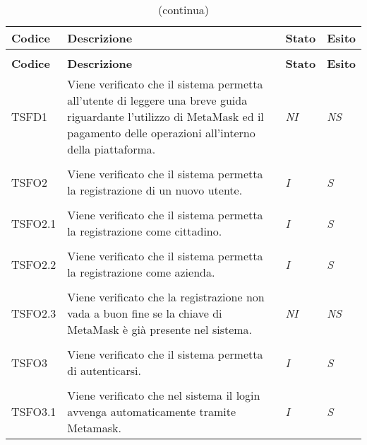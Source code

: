 	\begin{longtable}{ >{\centering}p{} >{}p{}
			>{\centering}p{} >{\centering}p{}}
			
		\caption{Riepilogo Test di Sistema}\\	
		\rowcolorhead
		\textbf{\color{white}Codice} 
		& \centering\textbf{\color{white}Descrizione} 
		& \centering\textbf{\color{white}Stato}
		& \centering\textbf{\color{white}Esito} 
		\tabularnewline %
		\endfirsthead	
		
		\rowcolor{white}\caption[]{(continua)}\\	
		\rowcolorhead
		\textbf{\color{white}Codice} 
		& \centering\textbf{\centering\color{white}Descrizione} 
		& \centering\textbf{\color{white}Stato}
		& \centering\textbf{\color{white}Esito} 
		\tabularnewline %
		\endhead	
		

		\hypertarget{TSFD1}{TSFD1} & Viene verificato che il sistema permetta all'utente 
		di leggere una breve guida riguardante l'utilizzo di MetaMask ed il pagamento 
		delle operazioni all'interno della piattaforma. & \textit{NI} & \textit{NS}\\ 

		\tabularnewline
		\hypertarget{TSFO2}{TSFO2} & Viene verificato che il sistema permetta la 
		registrazione di un nuovo utente. & \textit{I} & \textit{S}\\ 

		\tabularnewline
		\hypertarget{TSFO2.1}{TSFO2.1} & Viene verificato che il sistema permetta la 
		registrazione come cittadino. & \textit{I} & \textit{S}\\ 

		\tabularnewline
		\hypertarget{TSFO2.2}{TSFO2.2} & Viene verificato che il sistema permetta la 
		registrazione come azienda. & \textit{I} & \textit{S}\\ 

		\tabularnewline
		\hypertarget{TSFO2.3}{TSFO2.3} & Viene verificato che la registrazione non vada 
		a buon fine se la chiave di MetaMask è già presente nel sistema. & 
		\textit{NI} & \textit{NS}\\  

		\tabularnewline
		\hypertarget{TSFO3}{TSFO3} & Viene verificato che il sistema permetta di 
		autenticarsi. & \textit{I} & \textit{S}\\ 

		\tabularnewline
		\hypertarget{TSFO3.1}{TSFO3.1} & Viene verificato che nel sistema il login 
		avvenga automaticamente tramite Metamask. & \textit{I} & \textit{S}\\ 


\end{longtable}
